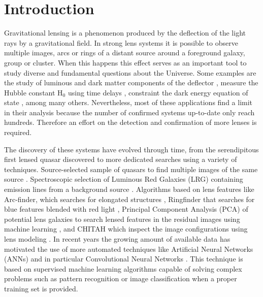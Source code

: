 \documentclass[tradiabstract,twocolumn]{aa}
\begin{document}
 
\maketitle
%

\section{Introduction}\label{sec:intro}

Gravitational lensing is a phenomenon produced by the deflection of the light rays by a gravitational field. In strong lens systems it is possible to observe multiple images, arcs or rings of a distant source around a foreground galaxy, group or cluster. When this happens this effect serves as an important tool to study diverse and fundamental questions about the Universe. Some examples are the study of luminous and dark matter components of the deflector \citep{Kochanek2001,Oguri2002,Davis2003,Jimenez-Vicente2015a}, measure the Hubble constant H$_0$ using time delays \citep{Falco1997,Vuissoz2007,Bonvin2017,Wong2020,Millon2020}, constraint the dark energy equation of state \citep{Biesiada2010,Collett-Auger2014,Cao2012,Cao2015}, among many others. Nevertheless, most of these applications find a limit in their analysis because the number of confirmed systems up-to-date only reach hundreds. Therefore an effort on the detection and confirmation of more lenses is required. 

The discovery of these systems have evolved through time, from the serendipitous first lensed quasar discovered \citep{Walsh1979} to more dedicated searches using a variety of techniques. Source-selected sample of quasars to find multiple images of the same source \citep[e.g.][]{Oguri2006,Inada2012,Agnello2018}. Spectroscopic selection of Luminous Red Galaxies (LRG) containing emission lines from a background source \citep{Bolton2004,Bolton2006,Brownstein2012}. Algorithms based on lens features like Arc-finder, which searches for elongated structures \citep{Alard2006}, Ringfinder that searches for blue features blended with red light \citep{Gavazzi2014}, Principal Component Analysis (PCA) of potential lens galaxies to search lensed features in the residual images using machine learning \citep{Joseph2014,Paraficz2016}, and CHITAH which inspect the image configurations using lens modeling \citep{Chan2015}. In recent years the growing amount of available data has motivated the use of more automated techniques like Artificial Neural Networks (ANNs)  \citep{Rosenblatt1957} and in particular Convolutional Neural Networks \citep[CNNs;][]{LeCun1989}. This technique is based on supervised machine learning algorithms capable of solving complex problems such as pattern recognition or image classification when a proper training set is provided. 
\end{document}

